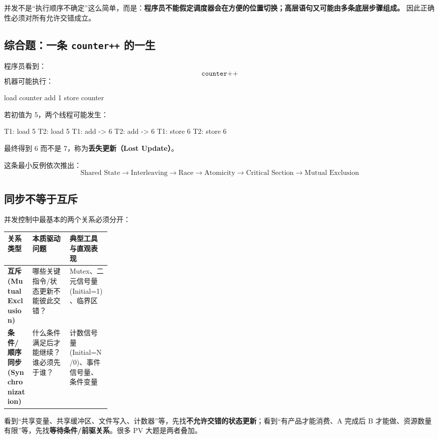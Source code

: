 \documentclass[11pt,a4paper]{ctexart}
\newcommand{\kw}[1]{\textbf{#1}}
\newcommand{\code}[1]{\texttt{#1}}
\begin{document}
\begin{corebox}[并发篇第一原则]
并发不是“执行顺序不确定”这么简单，而是：\kw{程序员不能假定调度器会在方便的位置切换；高层语句又可能由多条底层步骤组成。} 因此正确性必须对所有允许交错成立。
\end{corebox}

\subsection{综合题：一条 \code{counter++} 的一生}

程序员看到：
\[
\texttt{counter++}
\]
机器可能执行：
\begin{codeblock}
load counter
add 1
store counter
\end{codeblock}
若初值为 5，两个线程可能发生：
\begin{codeblock}
T1: load 5
T2: load 5
T1: add  -> 6
T2: add  -> 6
T1: store 6
T2: store 6
\end{codeblock}
最终得到 6 而不是 7，称为\kw{丢失更新（Lost Update）}。

这条最小反例依次推出：
\[
\boxed{
\text{Shared State}
\to\text{Interleaving}
\to\text{Race}
\to\text{Atomicity}
\to\text{Critical Section}
\to\text{Mutual Exclusion}
}
\]

\subsection{同步不等于互斥}

并发控制中最基本的两个关系必须分开：

\begingroup
\small
\renewcommand{\arraystretch}{1.25}
\setlength{\tabcolsep}{6pt}
\begin{tabularx}{\linewidth}{>{\bfseries}p{0.24\linewidth} X X}
\toprule
关系类型 & 本质驱动问题 & 典型工具与直观表现\\
\midrule
互斥 (Mutual Exclusion) & 哪些关键指令/状态更新不能彼此交错？ & Mutex、二元信号量 (Initial=1)、临界区\\
条件/顺序同步 (Synchronization) & 什么条件满足后才能继续？谁必须先于谁？ & 计数信号量 (Initial=N/0)、事件信号量、条件变量\\
\bottomrule
\end{tabularx}
\endgroup

\begin{exam}[考试识别]
看到“共享变量、共享缓冲区、文件写入、计数器”等，先找\kw{不允许交错的状态更新}；看到“有产品才能消费、A 完成后 B 才能做、资源数量有限”等，先找\kw{等待条件/前驱关系}。很多 PV 大题是两者叠加。
\end{exam}
\end{document}
